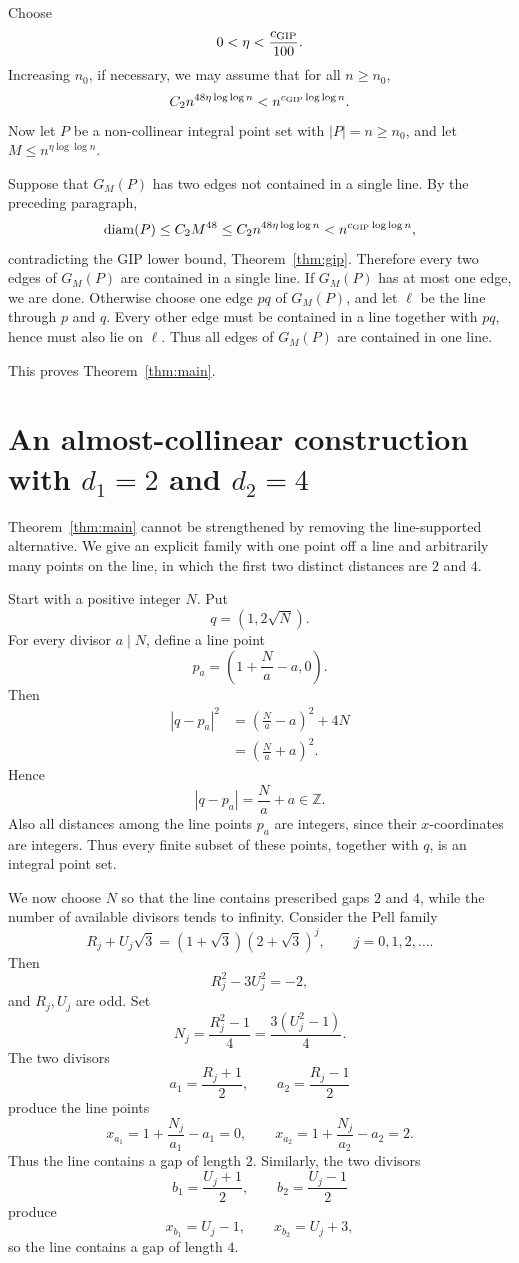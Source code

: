 \documentclass[11pt]{article}
\newcommand{\diam}{\operatorname{diam}}
\newcommand{\ZZ}{\mathbb Z}
\begin{document}
Choose
\[
        0<\eta<\frac{c_{\rm GIP}}{100}.
\]
Increasing \(n_0\), if necessary, we may assume that for all \(n\ge n_0\),
\[
        C_2 n^{48\eta\log\log n}<n^{c_{\rm GIP}\log\log n}.
\]
Now let \(P\) be a non-collinear integral point set with \(|P|=n\ge n_0\), and
let \(M\le n^{\eta\log\log n}\).

Suppose that \(G_M(P)\) has two edges not contained in a single line.  By the
preceding paragraph,
\[
        \diam(P)
        \le C_2M^{48}
        \le C_2n^{48\eta\log\log n}
        < n^{c_{\rm GIP}\log\log n},
\]
contradicting the GIP lower bound, Theorem~\ref{thm:gip}.  Therefore every two
edges of \(G_M(P)\) are contained in a single line.  If \(G_M(P)\) has at most
one edge, we are done.  Otherwise choose one edge \(pq\) of \(G_M(P)\), and let
\(\ell\) be the line through \(p\) and \(q\).  Every other edge must be contained
in a line together with \(pq\), hence must also lie on \(\ell\).  Thus all edges
of \(G_M(P)\) are contained in one line.

This proves Theorem~\ref{thm:main}.

\section{\texorpdfstring{An almost-collinear construction with \(d_1=2\) and \(d_2=4\)}{An almost-collinear construction with d1=2 and d2=4}}

Theorem~\ref{thm:main} cannot be strengthened by removing the line-supported
alternative.  We give an explicit family with one point off a line and
arbitrarily many points on the line, in which the first two distinct distances
are \(2\) and \(4\).

Start with a positive integer \(N\).  Put
\[
        q=(1,2\sqrt N).
\]
For every divisor \(a\mid N\), define a line point
\[
        p_a=\left(1+\frac Na-a,0\right).
\]
Then
\[
\begin{aligned}
        |q-p_a|^2
        &=\left(\frac Na-a\right)^2+4N  \\
        &=\left(\frac Na+a\right)^2.
\end{aligned}
\]
Hence
\[
        |q-p_a|=\frac Na+a\in\ZZ.
\]
Also all distances among the line points \(p_a\) are integers, since their
\(x\)-coordinates are integers.  Thus every finite subset of these points,
together with \(q\), is an integral point set.

We now choose \(N\) so that the line contains prescribed gaps \(2\) and \(4\),
while the number of available divisors tends to infinity.  Consider the Pell
family
\[
        R_j+U_j\sqrt3=(1+\sqrt3)(2+\sqrt3)^j,
        \qquad j=0,1,2,\ldots .
\]
Then
\[
        R_j^2-3U_j^2=-2,
\]
and \(R_j,U_j\) are odd.  Set
\[
        N_j=\frac{R_j^2-1}{4}=\frac{3(U_j^2-1)}{4}.
\]
The two divisors
\[
        a_1=\frac{R_j+1}{2},
        \qquad
        a_2=\frac{R_j-1}{2}
\]
produce the line points
\[
        x_{a_1}=1+\frac{N_j}{a_1}-a_1=0,
        \qquad
        x_{a_2}=1+\frac{N_j}{a_2}-a_2=2.
\]
Thus the line contains a gap of length \(2\).  Similarly, the two divisors
\[
        b_1=\frac{U_j+1}{2},
        \qquad
        b_2=\frac{U_j-1}{2}
\]
produce
\[
        x_{b_1}=U_j-1,
        \qquad
        x_{b_2}=U_j+3,
\]
so the line contains a gap of length \(4\).
\end{document}
